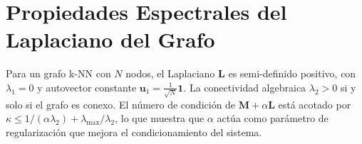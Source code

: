 \section{Propiedades Espectrales del Laplaciano del Grafo}

Para un grafo k-NN con $N$ nodos, el Laplaciano $\mathbf{L}$ es semi-definido positivo, con $\lambda_1 = 0$ y autovector constante $\mathbf{u}_1 = \frac{1}{\sqrt{N}} \mathbf{1}$. La conectividad algebraica $\lambda_2 > 0$ si y solo si el grafo es conexo. El número de condición de $\mathbf{M} + \alpha\mathbf{L}$ está acotado por $\kappa \leq 1/(\alpha\lambda_2) + \lambda_{\max}/\lambda_2$, lo que muestra que $\alpha$ actúa como parámetro de regularización que mejora el condicionamiento del sistema.